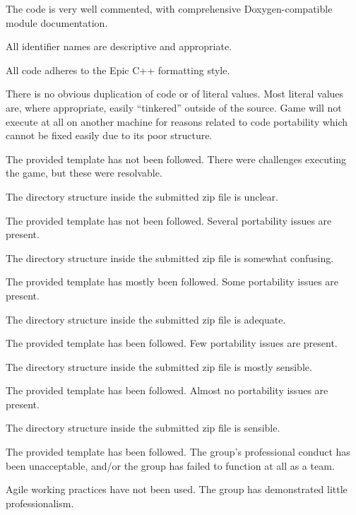 \documentclass{../fal_assignment}
\begin{document}
\begin{markingrubric}
        \grade The code is very well commented, with comprehensive Doxygen-compatible module documentation.
            \par All identifier names are descriptive and appropriate.
            \par All code adheres to the Epic C++ formatting style.
             \par There is no obvious duplication of code or of literal values. Most literal values are, where appropriate, easily ``tinkered'' outside of the source.  
%
        \grade\fail Game will not execute at all on another machine for reasons related to code portability which cannot be fixed easily due to its poor structure.
            \par The provided template has not been followed.
        \grade There were challenges executing the game, but these were resolvable.
            \par The directory structure inside the submitted zip file is unclear.
            \par The provided template has not been followed.
        \grade Several portability issues are present.
            \par The directory structure inside the submitted zip file is somewhat confusing.
            \par The provided template has mostly been followed.
        \grade Some portability issues are present.
            \par The directory structure inside the submitted zip file is adequate.
            \par The provided template has been followed.
        \grade Few portability issues are present.
            \par The directory structure inside the submitted zip file is mostly sensible.
            \par The provided template has been followed.
        \grade Almost no portability issues are present.
            \par The directory structure inside the submitted zip file is sensible.
            \par The provided template has been followed.
%
        \grade\fail The group's professional conduct has been unacceptable,
            and/or the group has failed to function at all as a team.
            \par Agile working practices have not been used.
        \grade The group has demonstrated little professionalism.

\end{markingrubric}
\end{document}
